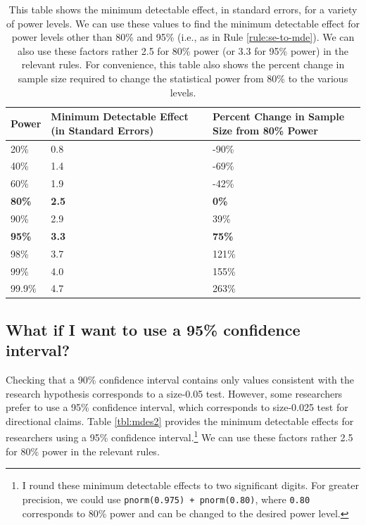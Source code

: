 \documentclass[12pt]{article}
\begin{document}
\begin{table}[h]
\centering 
\caption{This table shows the minimum detectable effect, in standard errors, for a variety of power levels. We can use these values to find the minimum detectable effect for power levels other than 80\% and 95\% (i.e., as in Rule \ref{rule:se-to-mde}). We can also use these factors rather 2.5 for 80\% power (or 3.3 for 95\% power) in the relevant rules. For convenience, this table also shows the percent change in sample size required to change the statistical power from 80\% to the various levels.}\label{tbl:mdes}
\footnotesize %
\renewcommand{\tabularxcolumn}[1]{>{\centering\arraybackslash}m{#1}} %
\setlength{\extrarowheight}{4pt} %
\begin{tabularx}{\linewidth}{|X|X|X|} %
\hline
\textbf{Power} & \textbf{Minimum Detectable Effect (in Standard Errors)} & \textbf{Percent Change in Sample Size from 80\% Power} \\
\hline
20\%   & 0.8 & -90\% \\
\hline
40\%   & 1.4 & -69\% \\
\hline
60\%   & 1.9 & -42\% \\
\hline
\textbf{80\%}   & \textbf{2.5} & \textbf{0\%} \\
\hline
90\%   & 2.9 & 39\% \\
\hline
\textbf{95\%}   & \textbf{3.3} & \textbf{75\%} \\
\hline
98\%   & 3.7 & 121\% \\
\hline
99\%   & 4.0 & 155\% \\
\hline
99.9\%  & 4.7 & 263\% \\
\hline
\end{tabularx}
\end{table}

\subsection*{What if I want to use a 95\% confidence interval?}

Checking that a 90\% confidence interval contains only values consistent with the research hypothesis corresponds to a size-0.05 test. 
However, some researchers prefer to use a 95\% confidence interval, which corresponds to size-0.025 test for directional claims. 
Table \ref{tbl:mdes2} provides the minimum detectable effects for researchers using a 95\% confidence interval.\footnote{
  I round these minimum detectable effects to two significant digits. 
  For greater precision, we could use \texttt{pnorm(0.975) + pnorm(0.80)}, where \texttt{0.80} corresponds to 80\% power and can be changed to the desired power level.
  } 
We can use these factors rather 2.5 for 80\% power in the relevant rules. 
\end{document}
